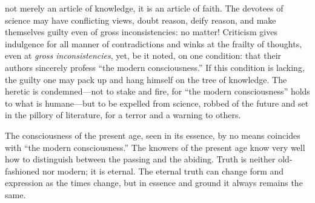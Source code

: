\documentclass[12pt,a4paper,openany]{book}
\newcommand{\opage}[1]{\marginnote{\footnotesize\textit{[#1]}}}
\begin{document}
not merely an article of knowledge, it is an article of faith. The
devotees of science may have conflicting views, doubt reason, deify
reason, and make themselves guilty even of gross inconsistencies: no
matter! Criticism gives indulgence for all manner of contradictions and
winks at the frailty of thoughts, even at \emph{gross inconsistencies},
yet, be it noted, on one condition: \opage{94}that their authors sincerely profess
``the modern consciousness.'' If this condition is lacking, the guilty one
may pack up and hang himself on the tree of knowledge. The heretic is
condemned---not to stake and fire, for ``the modern consciousness'' holds
to what is humane---but to be expelled from science, robbed of the
future and set in the pillory of literature, for a terror and a warning
to others.

The consciousness of the present age, seen in its essence, by no means
coincides with ``the modern consciousness.'' The knowers of the present
age know very well how to distinguish between the passing and the
abiding. Truth is neither old-fashioned nor modern; it is eternal. The
eternal truth can change form and expression as the times change, but in
essence and ground it always remains the same.
\end{document}
